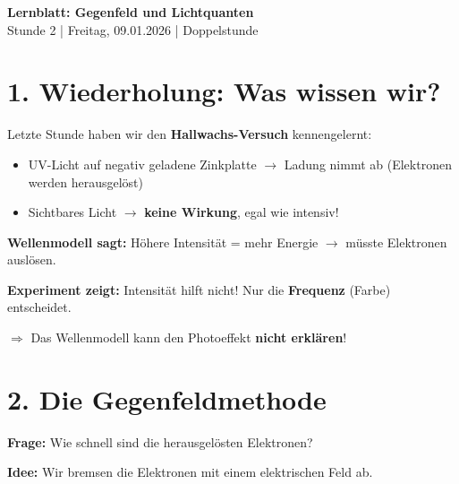 \documentclass[11pt,a4paper]{article}
\begin{document}
\begin{center}
{\Large\textbf{Lernblatt: Gegenfeld und Lichtquanten}}\\[0.3em]
{\normalsize Stunde 2 | Freitag, 09.01.2026 | Doppelstunde}
\end{center}

\vspace{0.3em}


\section*{1. Wiederholung: Was wissen wir?}

Letzte Stunde haben wir den \textbf{Hallwachs-Versuch} kennengelernt:

\begin{itemize}[nosep]
\item UV-Licht auf negativ geladene Zinkplatte $\rightarrow$ Ladung nimmt ab (Elektronen werden herausgelöst)
\item Sichtbares Licht $\rightarrow$ \textbf{keine Wirkung}, egal wie intensiv!
\end{itemize}

\begin{tcolorbox}[infobox={Problem: Widerspruch zum Wellenmodell}]
\textbf{Wellenmodell sagt:} Höhere Intensität = mehr Energie $\rightarrow$ müsste Elektronen auslösen.

\textbf{Experiment zeigt:} Intensität hilft nicht! Nur die \textbf{Frequenz} (Farbe) entscheidet.

$\Rightarrow$ Das Wellenmodell kann den Photoeffekt \textbf{nicht erklären}!
\end{tcolorbox}


\section*{2. Die Gegenfeldmethode}

\textbf{Frage:} Wie schnell sind die herausgelösten Elektronen?

\textbf{Idee:} Wir bremsen die Elektronen mit einem elektrischen Feld ab.
\end{document}
